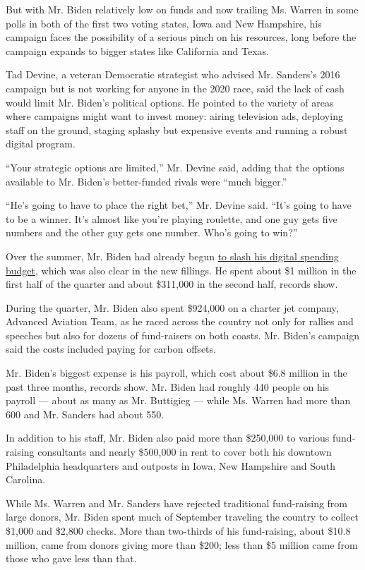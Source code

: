 But with Mr. Biden relatively low on funds and now trailing Ms. Warren
in some polls in both of the first two voting states, Iowa and New
Hampshire, his campaign faces the possibility of a serious pinch on his
resources, long before the campaign expands to bigger states like
California and Texas.

Tad Devine, a veteran Democratic strategist who advised Mr. Sanders's
2016 campaign but is not working for anyone in the 2020 race, said the
lack of cash would limit Mr. Biden's political options. He pointed to
the variety of areas where campaigns might want to invest money: airing
television ads, deploying staff on the ground, staging splashy but
expensive events and running a robust digital program.

``Your strategic options are limited,'' Mr. Devine said, adding that the
options available to Mr. Biden's better-funded rivals were ``much
bigger.''

``He's going to have to place the right bet,'' Mr. Devine said. ``It's
going to have to be a winner. It's almost like you're playing roulette,
and one guy gets five numbers and the other guy gets one number. Who's
going to win?''

Over the summer, Mr. Biden had already begun
\href{https://www.nytimes.com/2019/09/30/us/politics/joe-biden-ads.html}{to
slash his digital spending budget}, which was also clear in the new
fillings. He spent about \$1 million in the first half of the quarter
and about \$311,000 in the second half, records show.

During the quarter, Mr. Biden also spent \$924,000 on a charter jet
company, Advanced Aviation Team, as he raced across the country not only
for rallies and speeches but also for dozens of fund-raisers on both
coasts. Mr. Biden's campaign said the costs included paying for carbon
offsets.

Mr. Biden's biggest expense is his payroll, which cost about \$6.8
million in the past three months, records show. Mr. Biden had roughly
440 people on his payroll --- about as many as Mr. Buttigieg --- while
Ms. Warren had more than 600 and Mr. Sanders had about 550.

In addition to his staff, Mr. Biden also paid more than \$250,000 to
various fund-raising consultants and nearly \$500,000 in rent to cover
both his downtown Philadelphia headquarters and outposts in Iowa, New
Hampshire and South Carolina.

While Ms. Warren and Mr. Sanders have rejected traditional fund-raising
from large donors, Mr. Biden spent much of September traveling the
country to collect \$1,000 and \$2,800 checks. More than two-thirds of
his fund-raising, about \$10.8 million, came from donors giving more
than \$200; less than \$5 million came from those who gave less than
that.

